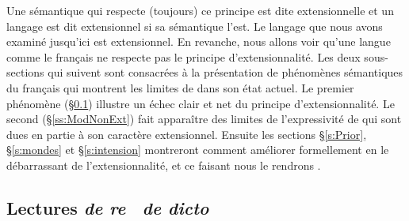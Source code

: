 Une sémantique qui respecte (toujours) ce principe est dite extensionnelle et un
langage est dit extensionnel si sa sémantique l'est.  Le langage {\LO}
que nous avons examiné jusqu'ici est extensionnel.  En revanche, nous
allons voir  qu'une langue comme le français ne respecte pas le
principe d'extensionnalité.  Les deux sous-sections qui suivent sont consacrées à la présentation de phénomènes sémantiques du français qui montrent les limites de {\LO} dans son état actuel. Le premier phénomène (\S\ref{ss:re/dicto}) illustre un échec clair et net du principe d'extensionnalité. Le second (\S\ref{ss:ModNonExt}) fait apparaître des limites de l'expressivité de {\LO} qui sont dues en partie à son caractère extensionnel.
Ensuite les sections \S\ref{s:Prior}, \S\ref{s:mondes} et \S\ref{s:intension} montreront comment améliorer formellement {\LO} en le débarrassant de l'extensionnalité, et ce faisant nous le rendrons .



\subsection{Lectures \textit{de re {\vs}\ de dicto}}
\label{ss:re/dicto}


